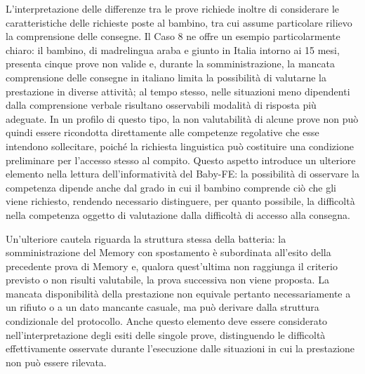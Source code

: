 L'interpretazione delle differenze tra le prove richiede inoltre di considerare le caratteristiche delle richieste poste al bambino, tra cui assume particolare rilievo la comprensione delle consegne. Il Caso 8 ne offre un esempio particolarmente chiaro: il bambino, di madrelingua araba e giunto in Italia intorno ai 15 mesi, presenta cinque prove non valide e, durante la somministrazione, la mancata comprensione delle consegne in italiano limita la possibilità di valutarne la prestazione in diverse attività; al tempo stesso, nelle situazioni meno dipendenti dalla comprensione verbale risultano osservabili modalità di risposta più adeguate. In un profilo di questo tipo, la non valutabilità di alcune prove non può quindi essere ricondotta direttamente alle competenze regolative che esse intendono sollecitare, poiché la richiesta linguistica può costituire una condizione preliminare per l'accesso stesso al compito. Questo aspetto introduce un ulteriore elemento nella lettura dell'informatività del Baby-FE: la possibilità di osservare la competenza dipende anche dal grado in cui il bambino comprende ciò che gli viene richiesto, rendendo necessario distinguere, per quanto possibile, la difficoltà nella competenza oggetto di valutazione dalla difficoltà di accesso alla consegna.

Un'ulteriore cautela riguarda la struttura stessa della batteria: la somministrazione del Memory con spostamento è subordinata all'esito della precedente prova di Memory e, qualora quest'ultima non raggiunga il criterio previsto o non risulti valutabile, la prova successiva non viene proposta. La mancata disponibilità della prestazione non equivale pertanto necessariamente a un rifiuto o a un dato mancante casuale, ma può derivare dalla struttura condizionale del protocollo. Anche questo elemento deve essere considerato nell'interpretazione degli esiti delle singole prove, distinguendo le difficoltà effettivamente osservate durante l'esecuzione dalle situazioni in cui la prestazione non può essere rilevata.


